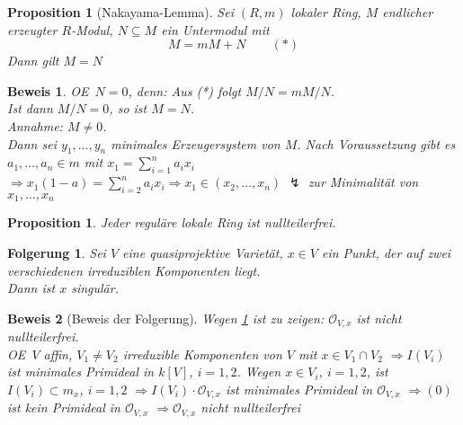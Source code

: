 \documentclass[a4paper,12pt]{report}
\theoremstyle{break}
\newtheorem{Prop}[Def]{Proposition}
\newtheorem{Folg}[Def]{Folgerung}
\theoremstyle{nonumberbreak}
\newtheorem{Bew}{Beweis}
\theoremstyle{nonumberplain}
\newcommand{\Sum}{\sum\limits}
\newcommand{\calO}{\mathcal{O}}
\renewcommand{\OE}{O\!\!E~}
\begin{document}
\begin{Prop}[Nakayama-Lemma]\label{19.5}
Sei $(R,m)$ lokaler Ring, $M$ endlicher erzeugter $R$-Modul, $N\subseteq M$ ein Untermodul mit
	\[M=mM+N \qquad (*)\]
Dann gilt $M=N$
\end{Prop}

\begin{Bew}
\OE $N=0$, denn: Aus (*) folgt $M/N=mM/N$.\\
Ist dann $M/N=0$, so ist $M=N$.\\
\emph{Annahme:} $M\ne0$.\\
Dann sei $y_1,\ldots ,y_n$ minimales Erzeugersystem von $M$. Nach Voraussetzung gibt es $a_1,\ldots ,a_n\in m$ mit $x_1=\Sum_{i=1}^na_ix_i$\\
$\Rightarrow x_1(1-a)=\Sum_{i=2}^na_ix_i \Rightarrow x_1\in (x_2,\ldots ,x_n)$ $\lightning$ zur Minimalit\"at von $x_1,\ldots ,x_n$
\end{Bew}

\begin{Prop}\label{19.6}
Jeder regul\"are lokale Ring ist nullteilerfrei.
\end{Prop}

\begin{Folg}
Sei $V$ eine quasiprojektive Variet\"at, $x\in V$ ein Punkt, der auf zwei verschiedenen irreduziblen Komponenten liegt.\\
Dann ist $x$ singul\"ar.
\end{Folg}

\begin{Bew}[Beweis der Folgerung]
Wegen \ref{19.6} ist zu zeigen: $\calO_{V,x}$ ist nicht nullteilerfrei.\\
\OE $V$ affin, $V_1\ne V_2$ irreduzible Komponenten von $V$ mit $x\in V_1\cap V_2$ $\Rightarrow I(V_i)$ ist minimales Primideal in $k[V]$, $i=1,2$. Wegen $x\in V_i$, $i=1,2$, ist $I(V_i)\subset m_x$, $i=1,2$ $\Rightarrow I(V_i)\cdot \calO_{V,x}$ ist minimales Primideal in $\calO_{V,x}$ $\Rightarrow (0)$ ist kein Primideal in $\calO_{V,x}$ $\Rightarrow \calO_{V,x}$ nicht nullteilerfrei
\end{Bew}
\end{document}
